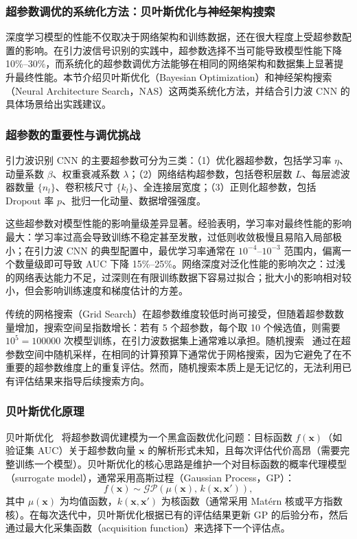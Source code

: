 \subsubsection*{超参数调优的系统化方法：贝叶斯优化与神经架构搜索}

深度学习模型的性能不仅取决于网络架构和训练数据，还在很大程度上受超参数配置的影响。在引力波信号识别的实践中，超参数选择不当可能导致模型性能下降 10\%--30\%，而系统化的超参数调优方法能够在相同的网络架构和数据集上显著提升最终性能。本节介绍贝叶斯优化（Bayesian Optimization）和神经架构搜索（Neural Architecture Search，NAS）这两类系统化方法，并结合引力波 CNN 的具体场景给出实践建议。

\subsubsection*{超参数的重要性与调优挑战}

引力波识别 CNN 的主要超参数可分为三类：（1）优化器超参数，包括学习率 $\eta$、动量系数 $\beta$、权重衰减系数 $\lambda$；（2）网络结构超参数，包括卷积层数 $L$、每层滤波器数量 $\{n_l\}$、卷积核尺寸 $\{k_l\}$、全连接层宽度；（3）正则化超参数，包括 Dropout 率 $p$、批归一化动量、数据增强强度。

这些超参数对模型性能的影响量级差异显著。经验表明，学习率对最终性能的影响最大：学习率过高会导致训练不稳定甚至发散，过低则收敛极慢且易陷入局部极小；在引力波 CNN 的典型配置中，最优学习率通常在 $10^{-4}$--$10^{-3}$ 范围内，偏离一个数量级即可导致 AUC 下降 15\%--25\%。网络深度对泛化性能的影响次之：过浅的网络表达能力不足，过深则在有限训练数据下容易过拟合；批大小的影响相对较小，但会影响训练速度和梯度估计的方差。

传统的网格搜索（Grid Search）在超参数维度较低时尚可接受，但随着超参数数量增加，搜索空间呈指数增长：若有 5 个超参数，每个取 10 个候选值，则需要 $10^5 = 100000$ 次模型训练，在引力波数据集上通常难以承担。随机搜索~\cite{Bergstra2012RandomSearch} 通过在超参数空间中随机采样，在相同的计算预算下通常优于网格搜索，因为它避免了在不重要的超参数维度上的重复评估。然而，随机搜索本质上是无记忆的，无法利用已有评估结果来指导后续搜索方向。

\subsubsection*{贝叶斯优化原理}

贝叶斯优化~\cite{Snoek2012BayesOpt, Shahriari2016BayesOptSurvey} 将超参数调优建模为一个黑盒函数优化问题：目标函数 $f(\mathbf{x})$（如验证集 AUC）关于超参数向量 $\mathbf{x}$ 的解析形式未知，且每次评估代价高昂（需要完整训练一个模型）。贝叶斯优化的核心思路是维护一个对目标函数的概率代理模型（surrogate model），通常采用高斯过程（Gaussian Process，GP）：
\begin{equation}
  f(\mathbf{x}) \sim \mathcal{GP}\!\left(\mu(\mathbf{x}),\, k(\mathbf{x}, \mathbf{x}')\right),
\end{equation}
其中 $\mu(\mathbf{x})$ 为均值函数，$k(\mathbf{x}, \mathbf{x}')$ 为核函数（通常采用 Mat\'{e}rn 核或平方指数核）。在每次迭代中，贝叶斯优化根据已有的评估结果更新 GP 的后验分布，然后通过最大化采集函数（acquisition function）来选择下一个评估点。

